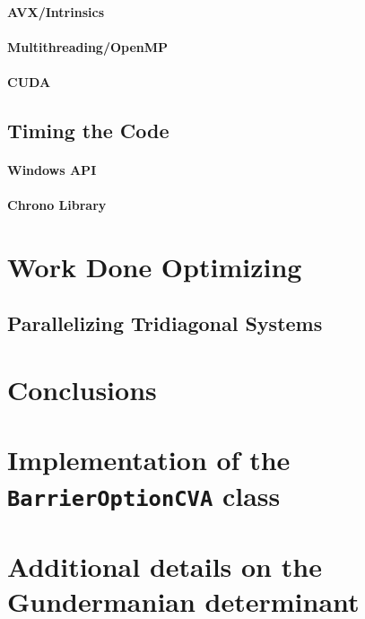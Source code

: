 \documentclass[12pt, oneside]{book}
\theoremstyle{plain}
\theoremstyle{definition}
\begin{document}
\subsubsection{AVX/Intrinsics}
\lipsum[5]
\subsubsection{Multithreading/OpenMP}
\lipsum[5]	
\subsubsection{CUDA}
\lipsum[5]	
\section{Timing the Code}
\subsubsection{Windows API}
\lipsum[5]
\subsubsection{Chrono Library}
\lipsum[5]

\chapter{Work Done Optimizing}

\section{Parallelizing Tridiagonal Systems}
\lipsum[5]



\chapter{Conclusions}
\lipsum[5]

\appendix
\chapter{Implementation of the {\tt BarrierOptionCVA} class}
\lipsum[100]
\chapter[shorter running title]{Additional details on the Gundermanian determinant}
\lipsum[100]
\end{document}
